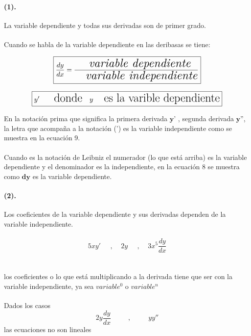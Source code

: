 \documentclass{article}
\begin{document}
\paragraph{(1).  }La variable dependiente y todas sus derivadas son de primer grado.\\\\
Cuando se habla de la variable dependiente en las deribasas se tiene:
 \begin{center}
 \begin{equation}
$$ \boxed{\LARGE\frac{dy}{dx}= \frac{\quad\text{\textit{variable dependiente} }}{ \quad\text{\textit{variable independiente}}}}$$
\end{equation}

 \begin{equation}
$$ \boxed{\LARGE y' \quad\text{ donde }   \;\; y \quad\text{es la varible dependiente}}$$
\end{equation}
 \end{center}
En la notación prima que significa la primera derivada $ \textbf{y'}$  , segunda derivada $\textbf{y''} $, la letra que acompaña a la notación (') es la variable independiente como se muestra en la ecuación 9.\\\\
Cuando es la notación de Leibniz el numerador (lo que está arriba) es la variable dependiente y el denominador es la independiente, en la ecuación 8 se muestra como $\textbf{dy}$ es la variable dependiente.


\paragraph{(2).  }Los coeficientes de la variable dependiente y sus derivadas dependen de la variable independiente.\\\\

\begin{equation}
5xy'\;\;\;\;\;,\;\;\;\;  2y\;\;\;\;\;,\;\;\;\; 3x^5\frac{dy}{dx}
\end{equation}
\\\\
los coeficientes o lo que está multiplicando a la derivada tiene que ser con la variable independiente, ya sea $variable^0$ o $variable^n$
\\\\
Dados los casos
\begin{equation}
2y\frac{dy}{dx}\;\;\;\;\;\;\;\;\;,\;\;\;\;\;\;\;\;\; yy''
\end{equation}
las ecuaciones no son lineales 
\end{document}
